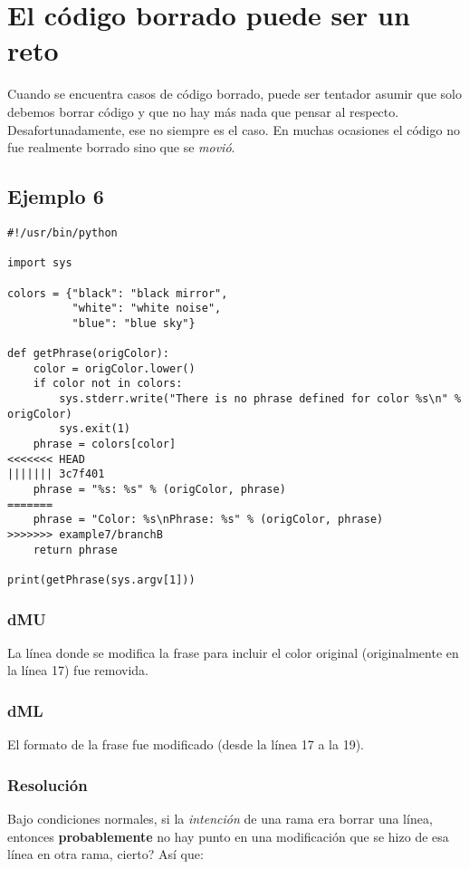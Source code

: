 
\section{El código borrado puede ser un reto}
\label{deleted_code}

Cuando se encuentra casos de código borrado, puede ser tentador asumir que solo debemos borrar código y que no hay más
nada que pensar al respecto. Desafortunadamente, ese no siempre es el caso. En muchas ocasiones el código no fue realmente
borrado sino que se {\it movió}.

\subsection{Ejemplo 6}
\label{example_06}

\begin{lstlisting}[style=python_style,
	basicstyle=\small,
	caption={\bf Ejemplo 6}]
#!/usr/bin/python

import sys

colors = {"black": "black mirror",
          "white": "white noise",
          "blue": "blue sky"}

def getPhrase(origColor):
    color = origColor.lower()
    if color not in colors:
        sys.stderr.write("There is no phrase defined for color %s\n" % origColor)
        sys.exit(1)
    phrase = colors[color]
<<<<<<< HEAD
||||||| 3c7f401
    phrase = "%s: %s" % (origColor, phrase)
=======
    phrase = "Color: %s\nPhrase: %s" % (origColor, phrase)
>>>>>>> example7/branchB
    return phrase

print(getPhrase(sys.argv[1]))
\end{lstlisting}

\subsubsection{dMU}
La línea donde se modifica la frase para incluir el color original (originalmente en la línea 17) fue removida.

\subsubsection{dML}
El formato de la frase fue modificado (desde la línea 17 a la 19).

\subsubsection{Resolución}
Bajo condiciones normales, si la {\it intención} de una rama era borrar una línea, entonces {\bf  probablemente} no
hay punto en una modificación que se hizo de esa línea en otra rama, cierto? Así que:

